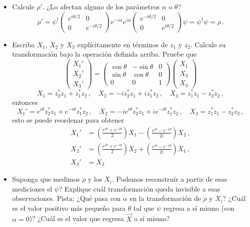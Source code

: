 \documentclass[12pt]{exam}
\begin{document}
\begin{questions}
\begin{itemize}
  \item Calcule $\rho'$. ¿Lo afectan alguno de los parámetros $\alpha$ o $\theta$?
\vspace{1em}
{\color{RedViolet}\small
        \[
        \rho' = \psi^\dagger \begin{pmatrix} e^{i\theta/2} & 0 \\ 0 & e^{-i\theta/2}\end{pmatrix} e^{-i\alpha} e^{i\alpha} \begin{pmatrix}e^{-i\theta/2} & 0 \\ 0 & e^{i\theta/2}\end{pmatrix}\psi = \psi^\dagger \psi = \rho\,.
        \]
}
  \item Escriba $X_1$, $X_2$ y $X_3$ explícitamente en términos de $z_1$ y $z_2$. Calcule su transformación bajo la operación definida arriba. Pruebe que
    \[
        \begin{pmatrix}X_1'\\ X_2'\\ X_3' \end{pmatrix} = \begin{pmatrix} \cos\theta & -\sin\theta & 0 \\ \sin\theta & \cos\theta & 0 \\ 0 & 0 & 1 \end{pmatrix}\begin{pmatrix}X_1\\ X_2\\ X_3 \end{pmatrix} 
    \]
\vspace{1em}
{\color{RedViolet}\small
        \[
        X_1 = z_2^* z_1 + z_1^* z_2\,,\quad X_2 = -i z_2^* z_1 + i z_1^* z_2\,,\quad X_3 = z_1^* z_1 - z_2^* z_2\,,
        \]
        entonces
        \[
        X_1' = e^{i\theta} z_2^* z_1 + e^{-i\theta} z_1^* z_2\,,\quad X_2 = -i e^{i\theta} z_2^* z_1 + i e^{-i\theta}z_1^* z_2\,,\quad X_3 = z_1^* z_1 - z_2^* z_2\,,
        \]
        esto se puede reordenar para obtener
        \begin{align*}
        X_1' &= \left(\frac{e^{i\theta} + e^{-i\theta}}{2}\right)X_1 - \left(\frac{e^{i\theta} - e^{-i\theta}}{2i}\right)X_2\,,\\
        X_2' &= \left(\frac{e^{i\theta} + e^{-i\theta}}{2}\right)X_2 + \left(\frac{e^{i\theta} - e^{-i\theta}}{2i}\right)X_1\,,\\
        X_3' &= X_3
        \end{align*}
}
  \item Suponga que medimos $\rho$ y los $X_i$. Podemos reconstruír a partir de esas mediciones el $\psi$? Explique cuál transformación queda invisible a esas observaciones. Pista: ¿Qué pasa con $\alpha$ en la transformación de $\rho$ y $X_i$? ¿Cuál es el valor positivo más pequeño para $\theta$ tal que $\psi$ regresa a sí mismo (con $\alpha = 0$)? ¿Cuál es el valor que regresa $\vec{X}$ a sí mismo? 

\end{itemize}
\end{questions}
\end{document}
